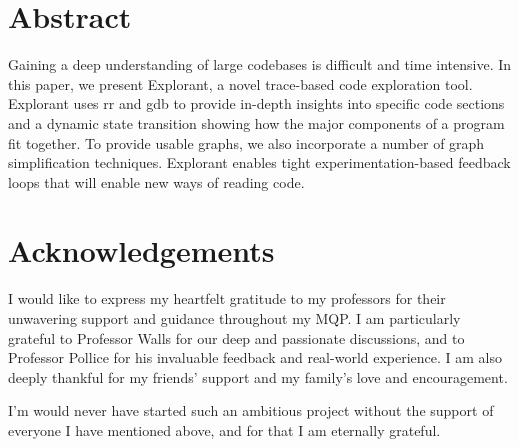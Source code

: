 \newpage %
\setcounter{page}{1} %

\section*{Abstract} %

\noindent Gaining a deep understanding of large codebases is difficult and time intensive. In this paper, we present Explorant, a novel trace-based code exploration tool. Explorant uses rr and gdb to provide in-depth insights into specific code sections and a dynamic state transition showing how the major components of a program fit together. To provide usable graphs, we also incorporate a number of graph simplification techniques. Explorant enables tight experimentation-based feedback loops that will enable new ways of reading code.  

\newpage %
\section*{Acknowledgements} %
I would like to express my heartfelt gratitude to my professors for their unwavering support and guidance throughout my MQP. I am particularly grateful to Professor Walls for our deep and passionate discussions, and to Professor Pollice for his invaluable feedback and real-world experience. I am also deeply thankful for my friends' support and my family's love and encouragement.

I'm would never have started such an ambitious project without the support of everyone I have mentioned above, and for that I am eternally grateful. 


\newpage %
\tableofcontents %
\listoftables %
\listoffigures %

